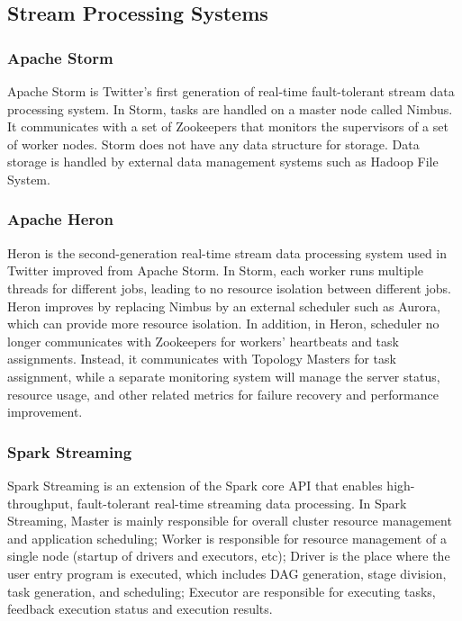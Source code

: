\documentclass[pdftex,twocolumn,10pt,letterpaper]{article}
\begin{document}
\subsection{Stream Processing Systems}

\subsubsection{Apache Storm\cite{toshniwal2014storm}}
Apache Storm is Twitter's first generation of real-time fault-tolerant stream data processing system. In Storm, tasks are handled on a master node called Nimbus. It communicates with a set of Zookeepers that monitors the supervisors of a set of worker nodes. Storm does not have any data structure for storage. Data storage is handled by external data management systems such as Hadoop File System. 

\subsubsection{Apache Heron}
Heron is the second-generation real-time stream data processing system used in Twitter improved from Apache Storm. In Storm, each worker runs multiple threads for different jobs, leading to no resource isolation between different jobs. Heron improves by replacing Nimbus by an external scheduler such as Aurora, which can provide more resource isolation. In addition, in Heron, scheduler no longer communicates with Zookeepers for workers' heartbeats and task assignments. Instead, it communicates with Topology Masters for task assignment, while a separate monitoring system will manage the server status, resource usage, and other related metrics for failure recovery and performance improvement. 

\subsubsection{Spark Streaming}

Spark Streaming is an extension of the Spark core API that enables high-throughput, fault-tolerant real-time streaming data processing. In Spark Streaming, Master is mainly responsible for overall cluster resource management and application scheduling; Worker is responsible for resource management of a single node (startup of drivers and executors, etc); Driver is the place where the user entry program is executed, which includes DAG generation, stage division, task generation, and scheduling; Executor are responsible for executing tasks, feedback execution status and execution results.
\end{document}
